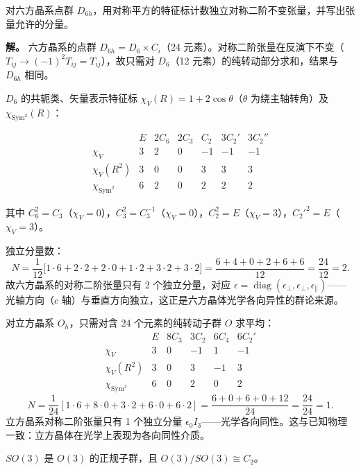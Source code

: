 \begin{example}
对六方晶系点群 $D_{6h}$，用对称平方的特征标计数独立对称二阶不变张量，并写出张量允许的分量。

\textbf{解。} 六方晶系的点群 $D_{6h}=D_6\times C_i$（24 元素）。对称二阶张量在反演下不变（$T_{ij}\to(-1)^2T_{ij}=T_{ij}$），故只需对 $D_6$（12 元素）的纯转动部分求和，结果与 $D_{6h}$ 相同。

$D_6$ 的共轭类、矢量表示特征标 $\chi_V(R)=1+2\cos\theta$（$\theta$ 为绕主轴转角）及 $\chi_{\mathrm{Sym}^2}(R)$：

\[
\begin{array}{c|cccccc}
& E & 2C_6 & 2C_3 & C_2 & 3C_2' & 3C_2'' \\
\hline
\chi_V & 3 & 2 & 0 & -1 & -1 & -1 \\
\chi_V(R^2) & 3 & 0 & 0 & 3 & 3 & 3 \\
\chi_{\mathrm{Sym}^2} & 6 & 2 & 0 & 2 & 2 & 2
\end{array}
\]

其中 $C_6^2=C_3$（$\chi_V=0$），$C_3^2=C_3^{-1}$（$\chi_V=0$），$C_2^2=E$（$\chi_V=3$），$C_2'^2=E$（$\chi_V=3$）。

独立分量数：
\[
N=\frac{1}{12}\bigl[1\cdot6+2\cdot2+2\cdot0+1\cdot2+3\cdot2+3\cdot2\bigr]
=\frac{6+4+0+2+6+6}{12}
=\frac{24}{12}=2.
\]
故六方晶系的对称二阶张量只有 2 个独立分量，对应 $\epsilon=\operatorname{diag}(\epsilon_\perp,\epsilon_\perp,\epsilon_\parallel)$——光轴方向（$c$ 轴）与垂直方向独立，这正是六方晶体光学各向异性的群论来源。

对立方晶系 $O_h$，只需对含 24 个元素的纯转动子群 $O$ 求平均：
\[
\begin{array}{c|ccccc}
& E & 8C_3 & 3C_2 & 6C_4 & 6C_2' \\
\hline
\chi_V & 3 & 0 & -1 & 1 & -1 \\
\chi_V(R^2) & 3 & 0 & 3 & -1 & 3 \\
\chi_{\mathrm{Sym}^2} & 6 & 0 & 2 & 0 & 2
\end{array}
\]
\[
N=\frac{1}{24}[1\cdot6+8\cdot0+3\cdot2+6\cdot0+6\cdot2]=\frac{6+0+6+0+12}{24}=\frac{24}{24}=1.
\]
立方晶系对称二阶张量只有 1 个独立分量 $\epsilon_0 I_3$——光学各向同性。这与已知物理一致：立方晶体在光学上表现为各向同性介质。
\end{example}

\begin{proposition}
 $SO(3)$ 是 $O(3)$ 的正规子群，且 $O(3)/SO(3)\cong C_2$。
\end{proposition}

